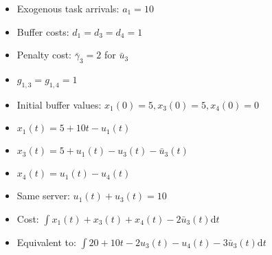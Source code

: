 \documentclass[pdf]{beamer}
\theoremstyle{definition}
\begin{document}
\begin{frame}

    \begin{columns}
        \begin{itemize}
            \item Exogenous task arrivals: $a_1=10$
            \item Buffer costs: $d_1 = d_3 = d_4 = 1$
            \item Penalty cost: $\bar{\gamma}_3 = 2$ for $\bar{u}_3$
            \item $g_{1,3} = g_{1,4} = 1$
            \item Initial buffer values: $x_1(0)=5, x_3(0)=5, x_4(0)=0$
            \item $x_1(t) = 5 + 10t - u_1(t)$
            \item $x_3(t) = 5 + u_1(t) - u_3(t) - \bar{u}_3(t)$
            \item $x_4(t) = u_1(t) - u_4(t)$
            \item Same server: $u_1(t) + u_3(t) = 10$
            \item Cost: $\int x_1(t) + x_3(t) + x_4(t) - 2\bar{u}_3(t) \mathrm{d}t$
            \item Equivalent to: $\int 20 + 10t - 2 u_3(t) - u_4(t) - 3 \bar{u}_3(t) \mathrm{d}t$
        \end{itemize}


\end{columns}
\end{frame}
\end{document}
